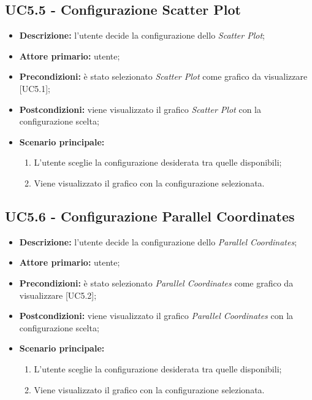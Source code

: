 \subsection{UC5.5 - Configurazione Scatter Plot}
\begin{itemize}
    \item \textbf{Descrizione:} l'utente decide la configurazione dello \textit{Scatter Plot};
    \item \textbf{Attore primario:} utente;
    \item \textbf{Precondizioni:} è stato selezionato \textit{Scatter Plot} come grafico da visualizzare [UC5.1];
    \item \textbf{Postcondizioni:} viene visualizzato il grafico \textit{Scatter Plot} con la configurazione scelta;
    \item \textbf{Scenario principale:}
    \begin{enumerate}
      \item L'utente sceglie la configurazione desiderata tra quelle disponibili;
      \item Viene visualizzato il grafico con la configurazione selezionata.
    \end{enumerate}
\end{itemize}

\subsection{UC5.6 - Configurazione Parallel Coordinates}
\begin{itemize}
    \item \textbf{Descrizione:} l'utente decide la configurazione dello \textit{Parallel Coordinates};
    \item \textbf{Attore primario:} utente;
    \item \textbf{Precondizioni:} è stato selezionato \textit{Parallel Coordinates} come grafico da visualizzare [UC5.2];
    \item \textbf{Postcondizioni:} viene visualizzato il grafico \textit{Parallel Coordinates} con la configurazione scelta;
    \item \textbf{Scenario principale:}
    \begin{enumerate}
      \item L'utente sceglie la configurazione desiderata tra quelle disponibili;
      \item Viene visualizzato il grafico con la configurazione selezionata.
    \end{enumerate}
\end{itemize}

